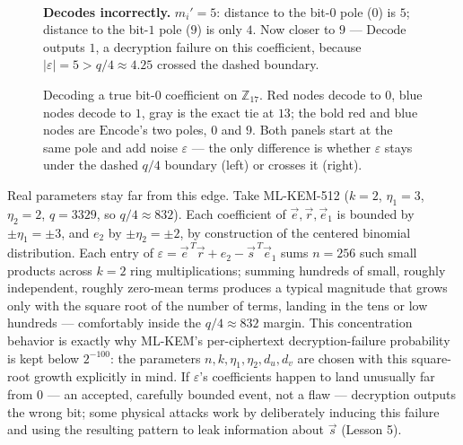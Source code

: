 \begin{figure}[ht]
\begin{minipage}[t]{0.47\textwidth}
\\[2pt]
{\small \textbf{Decodes incorrectly.} $m_i'=5$: distance to the bit-$0$ pole ($0$) is $5$; distance to the bit-$1$ pole ($9$) is only $4$. Now closer to $9$ --- $\mathrm{Decode}$ outputs $1$, a decryption failure on this coefficient, because $|\varepsilon|=5>q/4\approx4.25$ crossed the dashed boundary.}
\end{minipage}
\caption{Decoding a true bit-$0$ coefficient on $\mathbb{Z}_{17}$. Red nodes decode to $0$, blue nodes decode to $1$, gray is the exact tie at $13$; the bold red and blue nodes are $\mathrm{Encode}$'s two poles, $0$ and $9$. Both panels start at the same pole and add noise $\varepsilon$ --- the only difference is whether $\varepsilon$ stays under the dashed $q/4$ boundary (left) or crosses it (right).}
\label{fig:L3:decode-circle}
\end{figure}

Real parameters stay far from this edge. Take ML-KEM-512 ($k=2$, $\eta_1=3$, $\eta_2=2$, $q=3329$, so $q/4\approx832$). Each coefficient of $\vec e,\vec r,\vec e_1$ is bounded by $\pm\eta_1=\pm3$, and $e_2$ by $\pm\eta_2=\pm2$, by construction of the centered binomial distribution. Each entry of $\varepsilon=\vec e^{\,T}\vec r+e_2-\vec s^{\,T}\vec e_1$ sums $n=256$ such small products across $k=2$ ring multiplications; summing hundreds of small, roughly independent, roughly zero-mean terms produces a typical magnitude that grows only with the square root of the number of terms, landing in the tens or low hundreds --- comfortably inside the $q/4\approx832$ margin. This concentration behavior is exactly why ML-KEM's per-ciphertext decryption-failure probability is kept below $2^{-100}$: the parameters $n,k,\eta_1,\eta_2,d_u,d_v$ are chosen with this square-root growth explicitly in mind. If $\varepsilon$'s coefficients happen to land unusually far from $0$ --- an accepted, carefully bounded event, not a flaw --- decryption outputs the wrong bit; some physical attacks work by deliberately inducing this failure and using the resulting pattern to leak information about $\vec s$ (Lesson 5).


